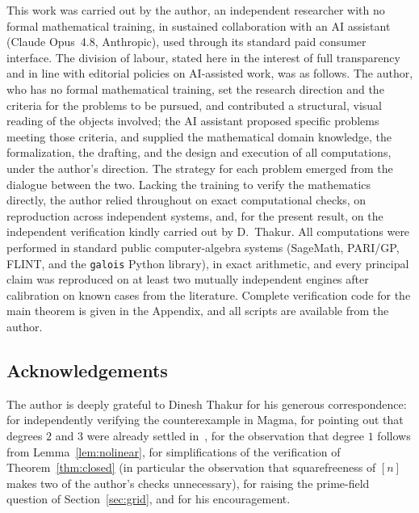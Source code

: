 \documentclass[11pt]{amsart}
\theoremstyle{plain}
\theoremstyle{definition}
\begin{document}
This work was carried out by the author, an independent researcher with no
formal mathematical training, in sustained collaboration with an AI assistant
(Claude Opus~4.8, Anthropic), used through its standard paid consumer
interface. The division of labour, stated here in the interest of full
transparency and in line with editorial policies on AI-assisted work, was as
follows. The author, who has no formal mathematical training, set the research
direction and the criteria for the problems to be pursued, and contributed a
structural, visual reading of the objects involved; the AI assistant proposed
specific problems meeting those criteria, and supplied the mathematical domain
knowledge, the formalization, the drafting, and the design and execution of all
computations, under the author's direction. The strategy for each problem
emerged from the dialogue between the two. Lacking the training to verify the
mathematics directly, the author relied throughout on exact computational
checks, on reproduction across independent systems, and, for the present
result, on the independent verification kindly carried out by D.~Thakur. All
computations were performed in standard public computer-algebra systems
(SageMath, PARI/GP, FLINT, and the \texttt{galois} Python library), in exact
arithmetic, and every principal claim was reproduced on at least two mutually
independent engines after calibration on known cases from the literature.
Complete verification code for the main theorem is given in the Appendix, and
all scripts are available from the author.

\subsection*{Acknowledgements}
The author is deeply grateful to Dinesh Thakur for his generous correspondence:
for independently verifying the counterexample in Magma, for pointing out that
degrees $2$ and $3$ were already settled in~\cite{Tha15}, for the observation
that degree $1$ follows from Lemma~\ref{lem:nolinear}, for simplifications of
the verification of Theorem~\ref{thm:closed} (in particular the observation that
squarefreeness of $[n]$ makes two of the author's checks unnecessary), for
raising the prime-field question of Section~\ref{sec:grid}, and for his
encouragement.
\end{document}
